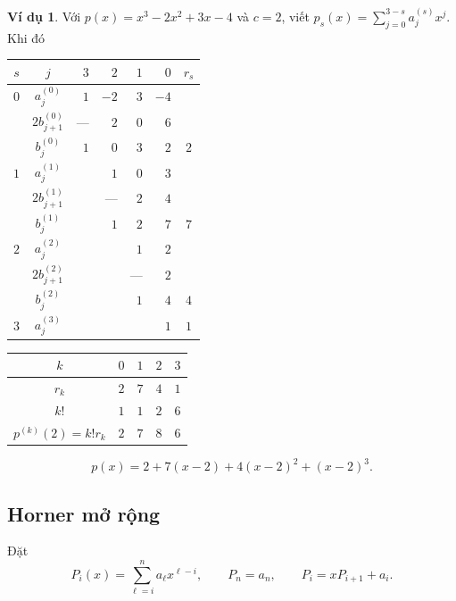 \documentclass[12pt,a4paper,oneside]{book}
\numberwithin{algorithm}{chapter}
\theoremstyle{definition}
\newtheorem{vidu}{Ví dụ}[chapter]
\begin{document}
\begin{vidu}
Với $p(x)=x^3-2x^2+3x-4$ và $c=2$, viết $p_s(x)=\sum_{j=0}^{3-s}a_j^{(s)}x^j$. Khi đó
\begin{center}
\begin{tabular}{c|c|rrrr|c}
\toprule
$s$ & $j$ & $3$ & $2$ & $1$ & $0$ & $r_s$\\
\midrule
$0$ & $a_j^{(0)}$ & $1$ & $-2$ & $3$ & $-4$ &\\
    & $2b_{j+1}^{(0)}$   & --- & $2$ & $0$ & $6$ &\\
    & $b_j^{(0)}$        & $1$ & $0$ & $3$ & $\boxed{2}$ & $2$\\
\midrule
$1$ & $a_j^{(1)}$ & & $1$ & $0$ & $3$ &\\
    & $2b_{j+1}^{(1)}$   & & --- & $2$ & $4$ &\\
    & $b_j^{(1)}$        & & $1$ & $2$ & $\boxed{7}$ & $7$\\
\midrule
$2$ & $a_j^{(2)}$ & & & $1$ & $2$ &\\
    & $2b_{j+1}^{(2)}$   & & & --- & $2$ &\\
    & $b_j^{(2)}$        & & & $1$ & $\boxed{4}$ & $4$\\
\midrule
$3$ & $a_j^{(3)}$ & & & & $\boxed{1}$ & $1$\\
\bottomrule
\end{tabular}
\end{center}
\begin{center}
\begin{tabular}{c|rrrr}
\toprule
$k$ & $0$ & $1$ & $2$ & $3$\\
\midrule
$r_k$ & $2$ & $7$ & $4$ & $1$\\
$k!$ & $1$ & $1$ & $2$ & $6$\\
\midrule
$p^{(k)}(2)=k!r_k$ & $\boxed{2}$ & $\boxed{7}$ & $\boxed{8}$ & $\boxed{6}$\\
\bottomrule
\end{tabular}
\end{center}
\[
 p(x)=2+7(x-2)+4(x-2)^2+(x-2)^3.
\]
\end{vidu}

\subsection{Horner mở rộng}
Đặt
\[
 P_i(x)=\sum_{\ell=i}^{n}a_\ell x^{\ell-i},\qquad
 P_n=a_n,\qquad P_i=xP_{i+1}+a_i.
\]
\end{document}
